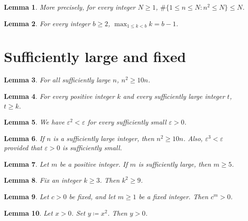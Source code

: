 \documentclass{article}
\newtheorem{lemma}{Lemma}
\begin{document}
\begin{lemma}\label{count-bounds}
More precisely, for every integer $N\ge1$, $\#\{1\le n\le N : n^2\le N\}\le N$.
\end{lemma}

\begin{lemma}\label{extremum-subscript}
For every integer $b\ge2$, $\max_{1\le k<b} k=b-1$.
\end{lemma}

\section{Sufficiently large and fixed}

\begin{lemma}\label{large}
For all sufficiently large $n$, $n^2\ge 10n$.
\end{lemma}

\begin{lemma}\label{large-noun}
For every positive integer $k$ and every sufficiently large integer $t$, $t\ge k$.
\end{lemma}

\begin{lemma}\label{small}
We have $\varepsilon^2<\varepsilon$ for every sufficiently small $\varepsilon>0$.
\end{lemma}

\begin{lemma}\label{large-if}
If $n$ is a sufficiently large integer, then $n^2\ge 10n$. Also, $\varepsilon^3<\varepsilon$ provided that $\varepsilon>0$ is sufficiently small.
\end{lemma}

\begin{lemma}\label{large-too-late}
Let $m$ be a positive integer. If $m$ is sufficiently large, then $m\ge5$.
\end{lemma}

\begin{lemma}\label{fix}
Fix an integer $k\ge3$. Then $k^2\ge9$.
\end{lemma}

\begin{lemma}\label{fixed}
Let $c>0$ be fixed, and let $m\ge1$ be a fixed integer. Then $c^m>0$.
\end{lemma}

\begin{lemma}\label{set-in-result}
Let $x>0$. Set $y\coloneqq x^2$. Then $y>0$.
\end{lemma}
\end{document}
